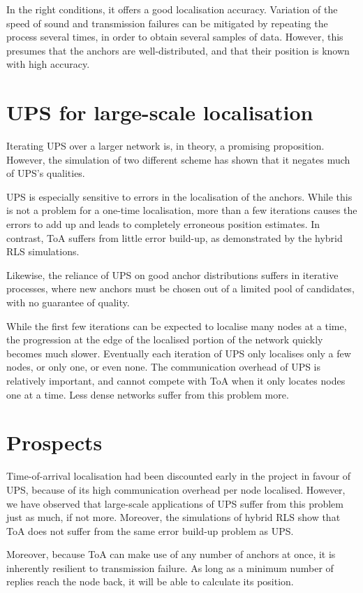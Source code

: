 \documentclass[12pt,a4paper,fleqn]{report}
\begin{document}
In the right conditions, it offers a good localisation accuracy. Variation of the speed of sound and transmission failures can be mitigated by repeating the process several times, in order to obtain several samples of data. However, this presumes that the anchors are well-distributed, and that their position is known with high accuracy.

\section{UPS for large-scale localisation}

Iterating UPS over a larger network is, in theory, a promising proposition. However, the simulation of two different scheme has shown that it negates much of UPS's qualities.

UPS is especially sensitive to errors in the localisation of the anchors. While this is not a problem for a one-time localisation, more than a few iterations causes the errors to add up and leads to completely erroneous position estimates. In contrast, ToA suffers from little error build-up, as demonstrated by the hybrid RLS simulations.

Likewise, the reliance of UPS on good anchor distributions suffers in iterative processes, where new anchors must be chosen out of a limited pool of candidates, with no guarantee of quality.

While the first few iterations can be expected to localise many nodes at a time, the progression at the edge of the localised portion of the network quickly becomes much slower. Eventually each iteration of UPS only localises only a few nodes, or only one, or even none. The communication overhead of UPS is relatively important, and cannot compete with ToA when it only locates nodes one at a time. Less dense networks suffer from this problem more.

\section{Prospects}

Time-of-arrival localisation had been discounted early in the project in favour of UPS, because of its high communication overhead per node localised. However, we have observed that large-scale applications of UPS suffer from this problem just as much, if not more. Moreover, the simulations of hybrid RLS show that ToA does not suffer from the same error build-up problem as UPS.

Moreover, because ToA can make use of any number of anchors at once, it is inherently resilient to transmission failure. As long as a minimum number of replies reach the node back, it will be able to calculate its position.
\end{document}
